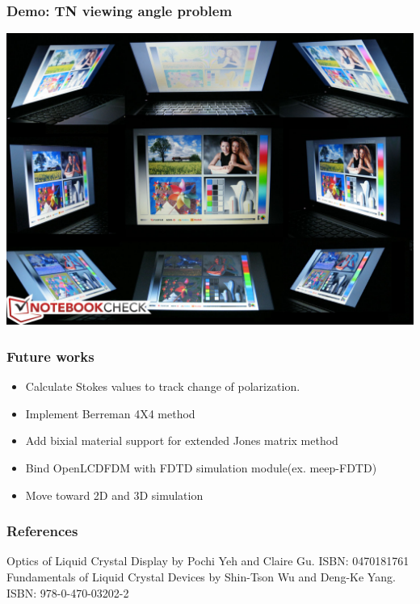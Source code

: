 \documentclass{beamer}
\begin{document}
\begin{frame}
\frametitle{Demo: TN viewing angle problem}
\begin{center}
\includegraphics[scale=0.2]{TN_viewangle.jpg}
\end{center}
\end{frame}
\begin{frame}
\frametitle{Future works}
\begin{itemize}
\item Calculate Stokes values to track change of polarization.
\item Implement Berreman 4X4 method
\item Add bixial material support for extended Jones matrix method
\item Bind OpenLCDFDM with FDTD simulation module(ex. meep-FDTD)
\item Move toward 2D and 3D simulation
\end{itemize}
\end{frame}
\begin{frame}
\frametitle{References}
\begin{thebibliography}{0}
 Optics of Liquid Crystal Display by Pochi Yeh and Claire Gu. ISBN: 0470181761
 Fundamentals of Liquid Crystal Devices by Shin-Tson Wu and Deng-Ke Yang. ISBN: 978-0-470-03202-2
\end{thebibliography}
\end{frame}
\end{document}
